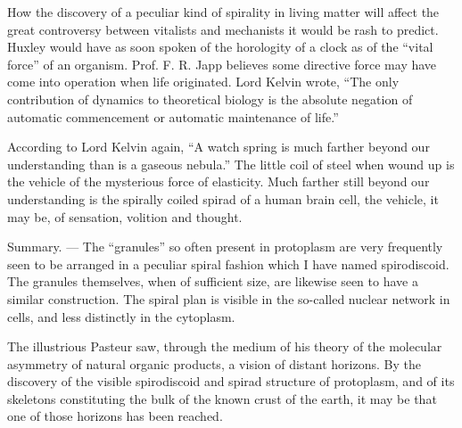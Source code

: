 \documentclass[a4paper, 12pt, oneside, landscape]{article}
\begin{document}
How the discovery of a peculiar kind of spirality in living matter will affect the great controversy between vitalists and mechanists it would be rash to predict. Huxley would have as soon spoken of the horologity of a clock as of the ``vital force'' of an organism. Prof. F. R. Japp believes some directive force may have come into operation when life originated. Lord Kelvin wrote, ``The only contribution of dynamics to theoretical biology is the absolute negation of automatic commencement or automatic maintenance of life.''

According to Lord Kelvin again, ``A watch spring is much farther beyond our understanding than is a gaseous nebula.'' The little coil of steel when wound up is the vehicle of the mysterious force of elasticity. Much farther still beyond our understanding is the spirally coiled spirad of a human brain cell, the vehicle, it may be, of sensation, volition and thought.

Summary. --- The ``granules'' so often present in protoplasm are very frequently seen to be arranged in a peculiar spiral fashion which I have named spirodiscoid. The granules themselves, when of sufficient size, are likewise seen to have a similar construction. The spiral plan is visible in the so-called nuclear network in cells, and less distinctly in the cytoplasm.

The illustrious Pasteur saw, through the medium of his theory of the molecular asymmetry of natural organic products, a vision of distant horizons. By the discovery of the visible spirodiscoid and spirad structure of protoplasm, and of its skeletons constituting the bulk of the known crust of the earth, it may be that one of those horizons has been reached.
\clearpage
\end{document}

